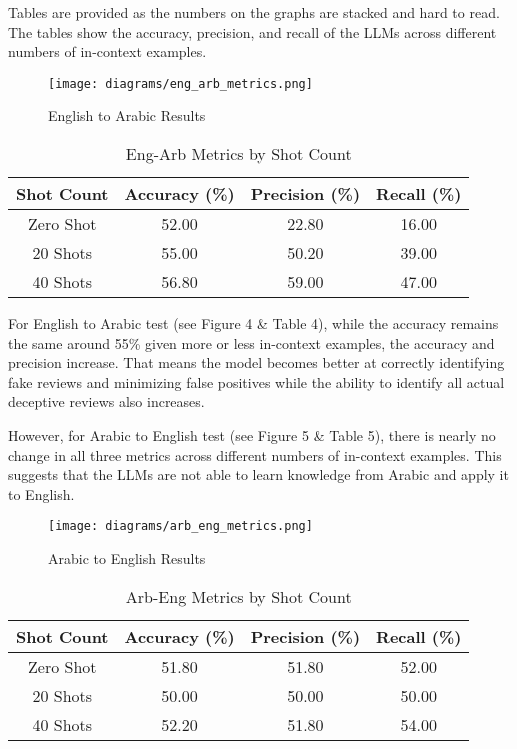 \documentclass[sigconf, nonacm]{acmart}
\theoremstyle{definition}
\begin{document}
Tables are provided as the numbers on the graphs are stacked and hard to read. The tables show the accuracy, precision, and recall of the LLMs across different numbers of in-context examples.

\begin{figure}[h]
  \centering
  \texttt{[image: diagrams/eng\_arb\_metrics.png]}
  \caption{English to Arabic Results}
\end{figure}

\begin{table}[h!]
  \centering
  \caption{Eng-Arb Metrics by Shot Count}
  \begin{tabular}{c c c c}
    \toprule
    Shot Count & Accuracy (\%) & Precision (\%) & Recall (\%) \\
    \midrule
    Zero Shot  & 52.00         & 22.80          & 16.00       \\
    20 Shots   & 55.00         & 50.20          & 39.00       \\
    40 Shots   & 56.80         & 59.00          & 47.00       \\
    \bottomrule
  \end{tabular}
\end{table}

For English to Arabic test (see Figure 4 \& Table 4), while the accuracy remains the same around 55\% given more or less in-context examples, the accuracy and precision increase. That means the model becomes better at correctly identifying fake reviews and minimizing false positives while the ability to identify all actual deceptive reviews also increases.

However, for Arabic to English test (see Figure 5 \& Table 5), there is nearly no change in all three metrics across different numbers of in-context examples. This suggests that the LLMs are not able to learn knowledge from Arabic and apply it to English.

\begin{figure}[h]
  \centering
  \texttt{[image: diagrams/arb\_eng\_metrics.png]}
  \caption{Arabic to English Results}
\end{figure}

\begin{table}[h!]
  \centering
  \caption{Arb-Eng Metrics by Shot Count}
  \begin{tabular}{c c c c}
    \toprule
    Shot Count & Accuracy (\%) & Precision (\%) & Recall (\%) \\
    \midrule
    Zero Shot  & 51.80         & 51.80          & 52.00       \\
    20 Shots   & 50.00         & 50.00          & 50.00       \\
    40 Shots   & 52.20         & 51.80          & 54.00       \\
    \bottomrule
  \end{tabular}
\end{table}
\end{document}
